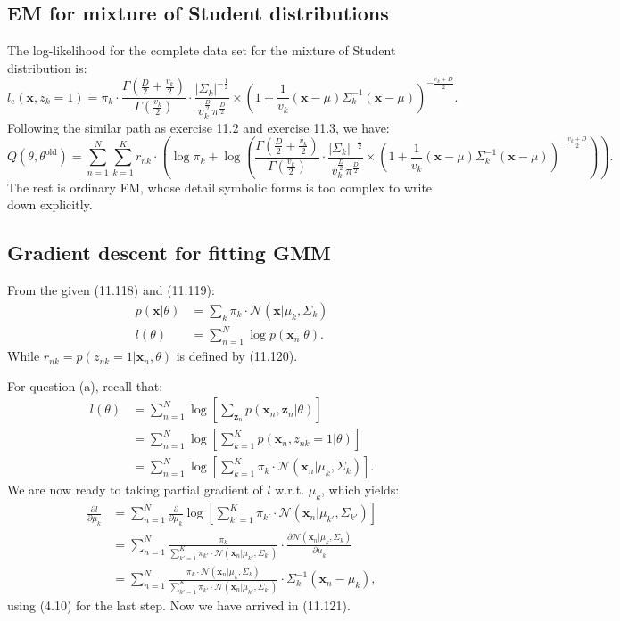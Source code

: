 \documentclass[UTF8]{ctexart}
\begin{document}
\subsection{EM for mixture of Student distributions}
The log-likelihood for the complete data set for the mixture of Student distribution is:
$$l_{\text{c}}(\textbf{x},z_{k}=1)=\pi_{k}\cdot\frac{\Gamma(\frac{D}{2}+\frac{v_{k}}{2})}{\Gamma(\frac{v_{k}}{2})}\cdot\frac{|\Sigma_{k}|^{-\frac{1}{2}}}{v_{k}^{\frac{D}{2}}\pi^{\frac{D}{2}}}\times\left(1+\frac{1}{v_{k}}(\textbf{x}-\mu)\Sigma_{k}^{-1}(\textbf{x}-\mu) \right)^{-\frac{v_{k}+D}{2}}.$$
Following the similar path as exercise 11.2 and exercise 11.3, we have:
$$Q(\theta,\theta^{\text{old}})=\sum_{n=1}^{N}\sum_{k=1}^{K}r_{nk}\cdot\left(\log \pi_{k}+\log \left( \frac{\Gamma(\frac{D}{2}+\frac{v_{k}}{2})}{\Gamma(\frac{v_{k}}{2})}\cdot\frac{|\Sigma_{k}|^{-\frac{1}{2}}}{v_{k}^{\frac{D}{2}}\pi^{\frac{D}{2}}}\times\left(1+\frac{1}{v_{k}}(\textbf{x}-\mu)\Sigma_{k}^{-1}(\textbf{x}-\mu) \right)^{-\frac{v_{k}+D}{2}} \right) \right).$$
The rest is ordinary EM, whose detail symbolic forms is too complex to write down explicitly.

\subsection{Gradient descent for fitting GMM}
From the given (11.118) and (11.119):
$$
\begin{aligned}
p(\textbf{x}|\theta)&=\sum_{k}\pi_{k}\cdot\mathcal{N}(\textbf{x}|\mu_{k},\Sigma_{k})\\
l(\theta)&=\sum_{n=1}^{N}\log p(\textbf{x}_{n}|\theta).
\end{aligned}
$$
While $r_{nk}=p(z_{nk}=1|\textbf{x}_{n},\theta)$ is defined by (11.120).

For question (a), recall that:
$$
\begin{aligned}
l(\theta)&=\sum_{n=1}^{N}\log\left[\sum_{\textbf{z}_{n}}p(\textbf{x}_{n},\textbf{z}_{n}|\theta) \right]\\
&=\sum_{n=1}^{N}\log\left[\sum_{k=1}^{K}p(\textbf{x}_{n},z_{nk}=1|\theta) \right]\\
&=\sum_{n=1}^{N}\log\left[\sum_{k=1}^{K}\pi_{k}\cdot\mathcal{N}(\textbf{x}_{n}|\mu_{k},\Sigma_{k}) \right].
\end{aligned}
$$
We are now ready to taking partial gradient of $l$ w.r.t. $\mu_{k}$, which yields:
$$
\begin{aligned}
\frac{\partial l}{\partial \mu_{k}}&=\sum_{n=1}^{N}\frac{\partial}{\partial \mu_{k}}\log \left[\sum_{k'=1}^{K}\pi_{k'}\cdot\mathcal{N}(\textbf{x}_{n}|\mu_{k'},\Sigma_{k'}) \right]\\
&=\sum_{n=1}^{N} \frac{\pi_{k}}{\sum_{k'=1}^{K}\pi_{k'}\cdot\mathcal{N}(\textbf{x}_{n}|\mu_{k'},\Sigma_{k'})}\cdot \frac{\partial \mathcal{N}(\textbf{x}_{n}|\mu_{k},\Sigma_{k})}{\partial \mu_{k}}\\
&=\sum_{n=1}^{N} \frac{\pi_{k}\cdot\mathcal{N}(\textbf{x}_{n}|\mu_{k},\Sigma_{k})}{\sum_{k'=1}^{K}\pi_{k'}\cdot\mathcal{N}(\textbf{x}_{n}|\mu_{k'},\Sigma_{k'})}\cdot\Sigma^{-1}_{k}(\textbf{x}_{n}-\mu_{k}),
\end{aligned}
$$
using (4.10) for the last step.
Now we have arrived in (11.121).
\end{document}
